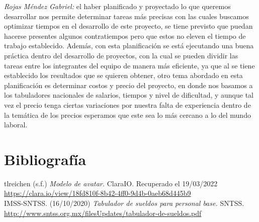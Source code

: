 \documentclass[12pt]{article} %
\begin{document}
	\emph{Rojas Méndez Gabriel:}
	el haber planificado y proyectado lo que queremos desarrollar nos permite determinar tareas más precisas con las cuales 
	buscamos optimizar tiempos en el desarrollo de este proyecto, se tiene previsto que puedan hacerse presentes algunos 
	contratiempos pero que estos no eleven el tiempo de trabajo establecido. Además, con esta planificación se está ejecutando 
	una buena práctica dentro del desarrollo de proyectos, con la cual se pueden dividir las tareas entre los integrantes del 
	equipo de manera más eficiente, ya que al se tiene establecido los resultados que se quieren obtener, otro tema abordado en 
	esta planificación es determinar costos y precio del proyecto, en donde nos basamos a los tabuladores nacionales de salarios, 
	tiempos y nivel de dificultad, y aunque tal vez el precio tenga ciertas variaciones por nuestra falta de experiencia dentro 
	de la temática de los precios esperamos que este sea lo más cercano a lo del mundo laboral.
 	
	\section{Bibliografía}
	
	tlreichen (s.f.) \emph{Modelo de avatar.} ClaraIO. Recuperado el 19/03/2022
	\color{blue}\url{https://clara.io/view/18fd810f-8b42-4ff0-9d4b-0aeb68d445b9}\color{black}
	\\
	
	IMSS-SNTSS. (16/10/2020) \emph{Tabulador de sueldos para personal base.} SNTSS. 
	\color{blue}\url{http://www.sntss.org.mx/filesUpdates/tabulador-de-sueldos.pdf}\color{black}
	
\end{document}
